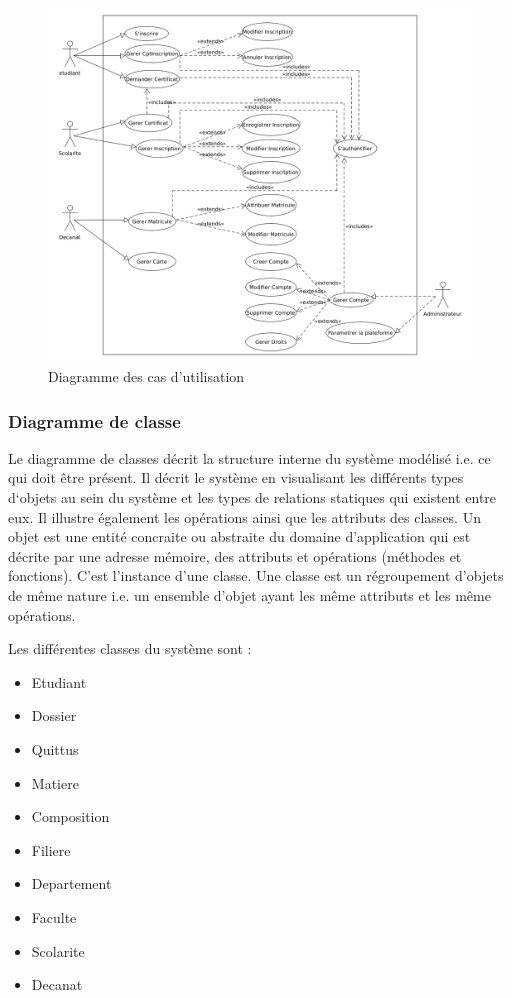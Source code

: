 \documentclass[12pt,a4paper]{article}
\begin{document}
	\begin{figure}[H]
		\centering
		\includegraphics[width=\textwidth]{use_case_diag}
		\caption{Diagramme des cas d'utilisation}
		\label{fig:figure3}
	\end{figure}


	\subsubsection{Diagramme de classe}
	Le diagramme de classes décrit la structure interne du système
	modélisé i.e. ce qui doit être présent. Il décrit le système en
	visualisant les différents types d‘objets au sein du système et
	les types de relations statiques qui existent entre eux. Il illustre
	également les opérations ainsi que les attributs des classes. Un objet est une entité concraite ou abstraite du domaine
	d’application qui est décrite par une adresse mémoire, des
	attributs et opérations (méthodes et fonctions). C’est
	l’instance d’une classe. Une classe est un régroupement d’objets de même nature i.e.	un ensemble d’objet ayant les même attributs et les même
	opérations.
		
	Les différentes classes du système sont :
	\begin{itemize}
		\item Etudiant
		\item Dossier
		\item Quittus
		\item Matiere
		\item Composition
		\item Filiere
		\item Departement
		\item Faculte
		\item Scolarite
		\item Decanat
	\end{itemize}
	
\end{document}
